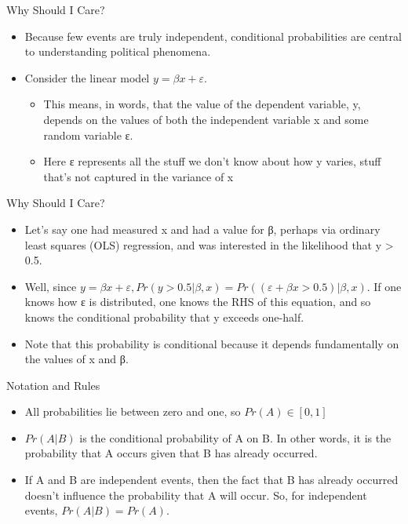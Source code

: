 \documentclass[
  ignorenonframetext,
]{beamer}
\providecommand{\tightlist}{%
  \setlength{\itemsep}{0pt}\setlength{\parskip}{0pt}}
\begin{document}
\begin{frame}{Why Should I Care?}
\protect\hypertarget{why-should-i-care-1}{}

\begin{itemize}
\item
  Because few events are truly independent, conditional probabilities
  are central to understanding political phenomena.
\item
  Consider the linear model \(y = βx + ε\).

  \begin{itemize}
  \tightlist
  \item
    This means, in words, that the value of the dependent variable, y,
    depends on the values of both the independent variable x and some
    random variable ε.
  \item
    Here ε represents all the stuff we don't know about how y varies,
    stuff that's not captured in the variance of x
  \end{itemize}
\end{itemize}

\end{frame}

\begin{frame}{Why Should I Care?}
\protect\hypertarget{why-should-i-care-2}{}

\begin{itemize}
\item
  Let's say one had measured x and had a value for β, perhaps via
  ordinary least squares (OLS) regression, and was interested in the
  likelihood that y \textgreater{} 0.5.
\item
  Well, since \(y = βx+ε, Pr(y > 0.5|β,x) = Pr((ε+βx > 0.5)|β,x)\). If
  one knows how ε is distributed, one knows the RHS of this equation,
  and so knows the conditional probability that y exceeds one-half.
\item
  Note that this probability is conditional because it depends
  fundamentally on the values of x and β.
\end{itemize}

\end{frame}

\begin{frame}{Notation and Rules}
\protect\hypertarget{notation-and-rules}{}

\begin{itemize}
\item
  All probabilities lie between zero and one, so \(Pr(A) ∈ [0,1]\)
\item
  \(Pr(A|B)\) is the conditional probability of A on B. In other words,
  it is the probability that A occurs given that B has already occurred.
\item
  If A and B are independent events, then the fact that B has already
  occurred doesn't influence the probability that A will occur. So, for
  independent events, \(P r(A|B) = P r(A)\).
\end{itemize}

\end{frame}
\end{document}
